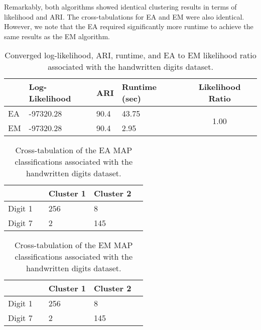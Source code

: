 \documentclass[12pt]{report}
\begin{document}
Remarkably, both algorithms showed identical clustering results in terms of likelihood and ARI. The cross-tabulations for EA and EM were also identical. However, we note that the EA required significantly more runtime to achieve the same results as the EM algorithm.


\newpage
\begin{table}[!htbp]
  \caption{Converged log-likelihood, ARI, runtime, and EA to EM likelihood ratio associated with the handwritten digits dataset.}
    \vspace{0.5cm}
  \begin{tabularx}{\textwidth}{l *{3}{X}c}
  \toprule
    &\textbf{Log-Likelihood}& \textbf{ARI} & \textbf{Runtime (sec)} & \textbf{Likelihood Ratio} \\
  \midrule
  EA & -97320.28     & 90.4 &  43.75 & \multirow{2}{*}{1.00}  \\
  EM & -97320.28    & 90.4 & 2.95  \\
  \bottomrule
  \end{tabularx}
\end{table}


\begin{table}[!htbp]
  \caption{Cross-tabulation of the EA MAP classifications associated with the handwritten digits dataset.}
    \vspace{0.5cm}
  \begin{tabularx}{\textwidth}{l *{4}{X}}
  \toprule
   && \textbf{Cluster 1}  & \textbf{Cluster 2}  \\
  \midrule
  Digit 1 && 256 & 8 \\
  Digit 7 && 2 &  145 \\
  \bottomrule
  \end{tabularx}
\end{table}

\begin{table}[!ht]
  \caption{Cross-tabulation of the EM MAP classifications associated with the handwritten digits dataset.}
    \vspace{0.5cm}
  \begin{tabularx}{\textwidth}{l *{4}{X}}
  \toprule
   && \textbf{Cluster 1}  & \textbf{Cluster 2} \\
  \midrule
  Digit 1 && 256 & 8 \\
  Digit 7 && 2 &  145 \\
  \bottomrule
  \end{tabularx}
\end{table}
\newpage


\end{document}
